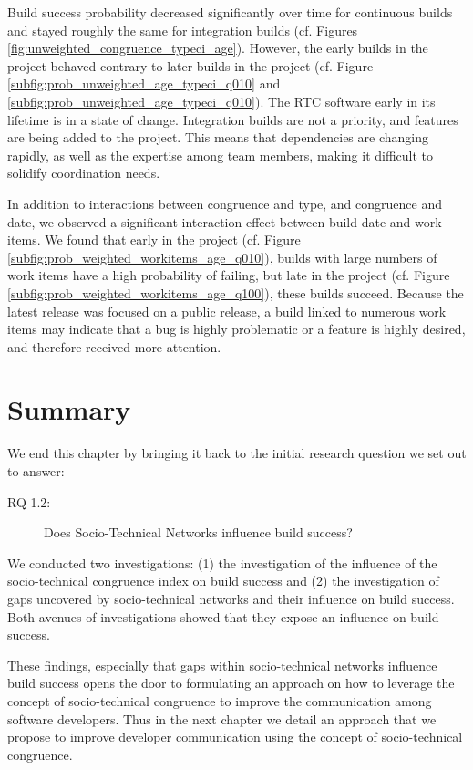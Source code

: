 Build success probability decreased significantly over time for continuous builds and stayed roughly the same for integration builds (cf. Figures \ref{fig:unweighted_congruence_typeci_age}).
However, the early builds in the project behaved contrary to later builds in the project (cf. Figure \ref{subfig:prob_unweighted_age_typeci_q010} and \ref{subfig:prob_unweighted_age_typeci_q010}). The RTC software early in its lifetime is in a state of change. Integration builds are not a priority, and features are being added to the project. This means that dependencies are changing rapidly, as well as the expertise among team members, making it difficult to solidify coordination needs.

In addition to interactions between congruence and type, and congruence and date, we observed a significant interaction effect between build date and work items.
We found that early in the project (cf. Figure \ref{subfig:prob_weighted_workitems_age_q010}), builds with large numbers of work items have a high probability of failing, but late in the project (cf. Figure \ref{subfig:prob_weighted_workitems_age_q100}), these builds succeed. Because the latest release was focused on a public release, a build linked to numerous work items may indicate that a bug is highly problematic or a feature is highly desired, and therefore received more attention. 



\section{Summary}
\label{sec:conclusion}
We end this chapter by bringing it back to the initial research question we set out to answer:
\begin{description}
  \item[RQ 1.2:] Does Socio-Technical Networks influence build success?
\end{description}

We conducted two investigations: (1) the investigation of the influence of the socio-technical congruence index on build success and (2) the investigation of gaps uncovered by socio-technical networks and their influence on build success.
Both avenues of investigations showed that they expose an influence on build success.

These findings, especially that gaps within socio-technical networks influence build success opens the door to formulating an approach on how to leverage the concept of socio-technical congruence to improve the communication among software developers.
Thus in the next chapter we detail an approach that we propose to improve developer communication using the concept of socio-technical congruence.
